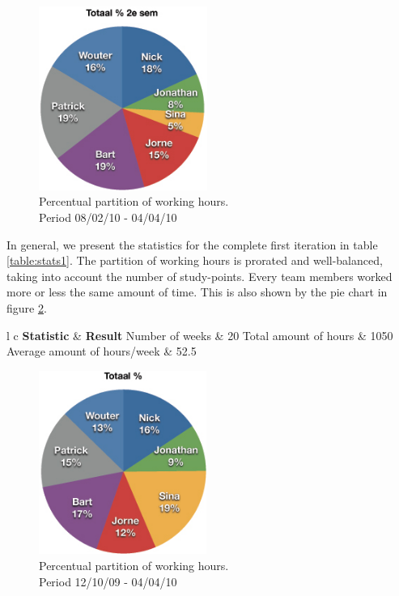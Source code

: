 \documentclass[salesmen, twoside]{../../../templates/latex/2009/softproj}
\begin{document}
\begin{projdoc}
			\begin{figure}
				\begin{center}
				\includegraphics[height=6cm]{../../img/partition-1iter-2.jpg}
				\caption{Percentual partition of working hours. \\ Period 08/02/10 - 04/04/10}
				\label{fig:stats1-2}
				\end{center}
			\end{figure}
			
			In general, we present the statistics for the complete first iteration in table \ref{table:stats1}. The 
			partition of working hours is prorated and well-balanced, taking into account the number of study-points. Every 
			team members worked more or less the same amount of time. This is 
			also shown by the pie chart
			in figure \ref{fig:stats1-3}.
			 
			\begin{table}
				\begin{center}
			\begin{tabular}{l c}
				\FL \textbf{Statistic} & \textbf{Result}
				\ML Number of weeks & 20
				\NN Total amount of hours  & 1050
				\NN Average amount of hours/week & 52.5
			\end{tabular}
			\end{center}
			\caption{General statistics for period 12/10/09 - 04/04/10.}
			\label{table:stats1}
			\end{table}
			
			\begin{figure}
				\begin{center}
				\includegraphics[height=6cm]{../../img/partition-1iter-3.jpg}
				\caption{Percentual partition of working hours. \\ Period 12/10/09 - 04/04/10}
				\label{fig:stats1-3}
				\end{center}
			\end{figure}
			

\end{projdoc}
\end{document}
